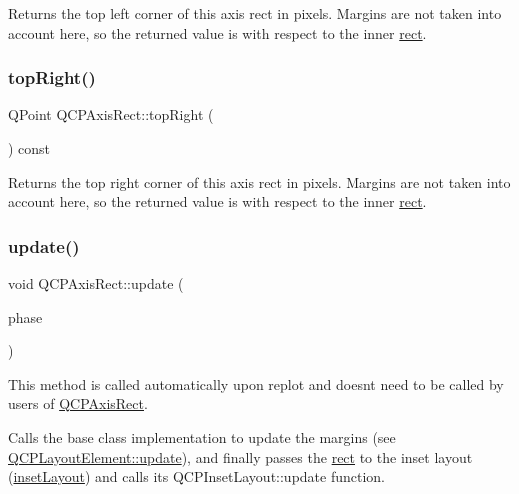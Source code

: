 Returns the top left corner of this axis rect in pixels. Margins are not taken into account here, so the returned value is with respect to the inner \hyperlink{class_q_c_p_layout_element_a208effccfe2cca4a0eaf9393e60f2dd4}{rect}. \hypertarget{class_q_c_p_axis_rect_a7aa221967549ba71b98c465bf8234758}{}\label{class_q_c_p_axis_rect_a7aa221967549ba71b98c465bf8234758} 
\subsubsection{\texorpdfstring{top\+Right()}{topRight()}}
{\footnotesize\ttfamily Q\+Point Q\+C\+P\+Axis\+Rect\+::top\+Right (\begin{DoxyParamCaption}{ }\end{DoxyParamCaption}) const\hspace{0.3cm}{\ttfamily [inline]}}

Returns the top right corner of this axis rect in pixels. Margins are not taken into account here, so the returned value is with respect to the inner \hyperlink{class_q_c_p_layout_element_a208effccfe2cca4a0eaf9393e60f2dd4}{rect}. \hypertarget{class_q_c_p_axis_rect_a255080a017df9083a60a321ef2ba9ed8}{}\label{class_q_c_p_axis_rect_a255080a017df9083a60a321ef2ba9ed8} 
\subsubsection{\texorpdfstring{update()}{update()}}
{\footnotesize\ttfamily void Q\+C\+P\+Axis\+Rect\+::update (\begin{DoxyParamCaption}\item[{\hyperlink{class_q_c_p_layout_element_a0d83360e05735735aaf6d7983c56374d}{Update\+Phase}}]{phase }\end{DoxyParamCaption})\hspace{0.3cm}{\ttfamily [virtual]}}

This method is called automatically upon replot and doesn\textquotesingle{}t need to be called by users of \hyperlink{class_q_c_p_axis_rect}{Q\+C\+P\+Axis\+Rect}.

Calls the base class implementation to update the margins (see \hyperlink{class_q_c_p_layout_element_a929c2ec62e0e0e1d8418eaa802e2af9b}{Q\+C\+P\+Layout\+Element\+::update}), and finally passes the \hyperlink{class_q_c_p_layout_element_a208effccfe2cca4a0eaf9393e60f2dd4}{rect} to the inset layout (\hyperlink{class_q_c_p_axis_rect_a949f803466619924c7018df4b511ae10}{inset\+Layout}) and calls its Q\+C\+P\+Inset\+Layout\+::update function. 

